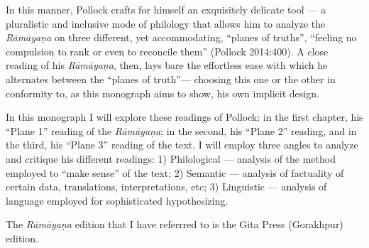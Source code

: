 In this manner, Pollock crafts for himself an exquisitely delicate tool --- a pluralistic and inclusive mode of philology that allows him to analyze the {\sl Rāmāyaṇa} on three different, yet accommodating, “planes of truths”, “feeling no compulsion to rank or even to reconcile them” (Pollock 2014:400). A close reading of his {\sl Rāmāyaṇa}, then, lays bare the effortless ease with which he alternates between the “planes of truth”--- choosing this one or the other in conformity to, as this monograph aims to show, his own implicit design. 

In this monograph I will explore these readings of Pollock: in the first chapter, his “Plane 1” reading of the {\sl Rāmāyaṇa}; in the second, his “Plane 2” reading, and in the third, his “Plane 3” reading of the text. I will employ three angles to analyze and critique his different readings: 1) Philological --- analysis of the method employed to “make sense” of the text; 2) Semantic --- analysis of factuality of certain data, translations, interpretations, etc; 3) Linguistic --- analysis of language employed for sophisticated hypothesizing.

The {\sl Rāmāyaṇa} edition that I have referrred to is the Gita Press (Gorakhpur) edition.

\theendnotes
